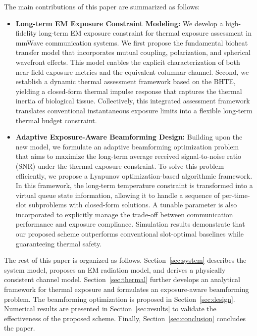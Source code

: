\documentclass[journal]{IEEEtran}
\begin{document}
The main contributions of this paper are summarized as follows:
\begin{itemize}
    \item \textbf{Long-term EM Exposure Constraint Modeling:} We develop a high-fidelity long-term EM exposure constraint for thermal exposure assessment in mmWave communication systems. We first propose the fundamental bioheat transfer model that incorporates mutual coupling, polarization, and spherical wavefront effects. This model enables the explicit characterization of both near-field exposure metrics and the equivalent columnar channel. Second, we establish a dynamic thermal assessment framework based on the BHTE, yielding a closed-form thermal impulse response that captures the thermal inertia of biological tissue. Collectively, this integrated assessment framework translates conventional instantaneous exposure limits into a flexible long-term thermal budget constraint.

    \item \textbf{Adaptive Exposure-Aware Beamforming Design:} Building upon the new model, we formulate an adaptive beamforming optimization problem that aims to maximize the long-term average received signal-to-noise ratio (SNR) under the thermal exposure constraint. To solve this problem efficiently, we propose a Lyapunov optimization-based algorithmic framework. In this framework, the long-term temperature constraint is transformed into a virtual queue state information, allowing it to handle a sequence of per-time-slot subproblems with closed-form solutions. A tunable parameter is also incorporated to explicitly manage the trade-off between communication performance and exposure compliance. Simulation results demonstrate that our proposed scheme outperforms conventional slot-optimal baselines while guaranteeing thermal safety.
\end{itemize}

The rest of this paper is organized as follows. Section~\ref{sec:system} describes the system model, proposes an EM radiation model, and derives a physically consistent channel model. Section~\ref{sec:thermal} further develops an analytical framework for thermal exposure and formulates an exposure-aware beamforming problem. The beamforming optimization is proposed in Section~\ref{sec:design}. Numerical results are presented in Section~\ref{sec:results} to validate the effectiveness of the proposed scheme. Finally, Section~\ref{sec:conclusion} concludes the paper.
\end{document}
